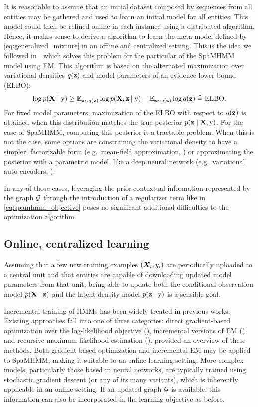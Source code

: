 It is reasonable to assume that an initial dataset composed by sequences from all entities may be gathered and used to learn an initial model for all entities. This model could then be refined online in each instance using a distributed algorithm. Hence, it makes sense to derive a algorithm to learn the meta-model defined by \eqref{eq:generalized_mixture} in an offline and centralized setting. This is the idea we followed in \cite{SpaMHMM}, which solves this problem for the particular of the SpaMHMM model using EM. This algorithm is based on the alternated maximization over variational densities $q({\mathbf{z}})$ and model parameters of an evidence lower bound (ELBO):
\begin{equation}
\log p({\mathbf{X}} \mid {\textnormal{y}}) \geq \mathbb{E}_{{\mathbf{z}} \sim q({\mathbf{z}})} \log p({\mathbf{X}}, {\mathbf{z}} \mid {\textnormal{y}})  - \mathbb{E}_{{\mathbf{z}} \sim q({\mathbf{z}})}\log q({\mathbf{z}}) \triangleq \mathrm{ELBO}.
\end{equation}
For fixed model parameters, maximization of the ELBO with respect to $q({\mathbf{z}})$ is attained when this distribution matches the true posterior $p({\mathbf{z}} \mid {\mathbf{X}},{\textnormal{y}})$. For the case of SpaMHMM, computing this posterior is a tractable problem. When this is not the case, some options are constraining the variational density to have a simpler, factorizable form (e.g.\ mean-field approximation, \citet{Blei2003}) or approximating the posterior with a parametric model, like a deep neural network (e.g.\ variational auto-encoders, \citet{Kingma2013}).

In any of those cases, leveraging the prior contextual information represented by the graph ${\mathcal{G}}$ through the introduction of a regularizer term like in \eqref{eq:spamhmm_objective} poses no significant additional difficulties to the optimization algorithm.

\subsection{Online, centralized learning}
\label{sec:online_learning}

Assuming that a few new training examples $({\bm{X}}_i,y_i)$ are periodically uploaded to a central unit and that entities are capable of downloading updated model parameters from that unit, being able to update both the conditional observation model $p({\mathbf{X}} \mid {\mathbf{z}})$ and the latent density model $p({\mathbf{z}} \mid {\textnormal{y}})$ is a sensible goal.

Incremental training of HMMs has been widely treated in previous works. Existing approaches fall into one of three categories: direct gradient-based optimization over the log-likelihood objective (\citet{Baldi1994}), incremental versions of EM (\citet{Digalakis1999, Mongillo2008}), and recursive maximum likelihood estimation (\citet{Ryden1997}). \citet{Khreich2012} provided an overview of these methods. Both gradient-based optimization and incremental EM may be applied to SpaMHMM, making it suitable to an online learning setting. More complex models, particularly those based in neural networks, are typically trained using stochastic gradient descent (or any of its many variants), which is inherently applicable in an online setting. If an updated graph ${\mathcal{G}}$ is available, this information can also be incorporated in the learning objective as before.

